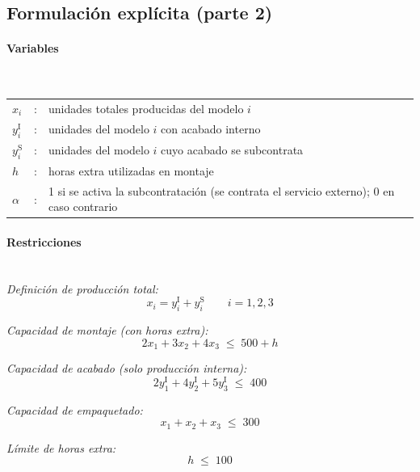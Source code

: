 \subsection{Formulación explícita (parte 2)}

\paragraph{Variables}\mbox{}\\
\begin{tabular}{lcl}
$x_i$ & : & unidades totales producidas del modelo $i$ \\
$y_i^{\mathrm{I}}$ & : & unidades del modelo $i$ con acabado interno \\
$y_i^{\mathrm{S}}$ & : & unidades del modelo $i$ cuyo acabado se subcontrata \\
$h$ & : & horas extra utilizadas en montaje \\
$\alpha$ & : & 1 si se activa la subcontratación (se contrata el servicio externo); 0 en caso contrario \\
\end{tabular}

\paragraph{Restricciones}\mbox{}\\[1mm]

\textit{Definición de producción total:}
\begin{equation}
x_i = y_i^{\mathrm{I}} + y_i^{\mathrm{S}} \qquad i = 1,2,3
\end{equation}

\textit{Capacidad de montaje (con horas extra):}
\begin{equation}
2x_1 + 3x_2 + 4x_3 \;\leq\; 500 + h
\end{equation}

\textit{Capacidad de acabado (solo producción interna):}
\begin{equation}
2y_1^{\mathrm{I}} + 4y_2^{\mathrm{I}} + 5y_3^{\mathrm{I}} \;\leq\; 400
\end{equation}

\textit{Capacidad de empaquetado:}
\begin{equation}
x_1 + x_2 + x_3 \;\leq\; 300
\end{equation}

\textit{Límite de horas extra:}
\begin{equation}
h \;\leq\; 100
\end{equation}

